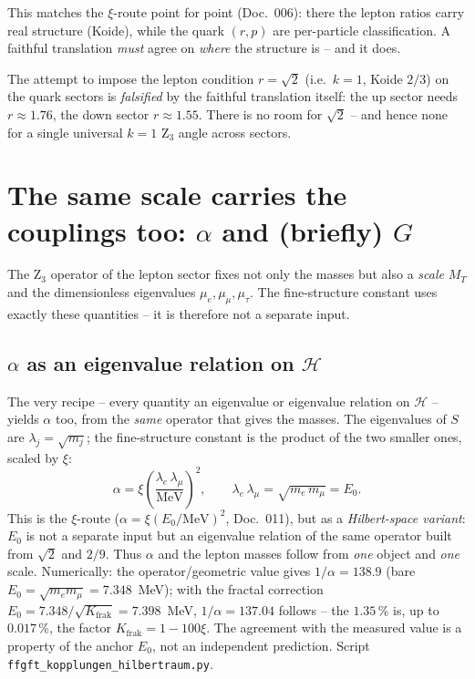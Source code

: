 This matches the $\xi$-route point for point (Doc.~006): there the lepton ratios
carry real structure (Koide), while the quark $(r,p)$ are per-particle
classification. A faithful translation \emph{must} agree on \emph{where} the
structure is -- and it does.

\begin{keyresult}
The attempt to impose the lepton condition $r=\sqrt2$ (i.e.\ $k=1$, Koide $2/3$)
on the quark sectors is \emph{falsified} by the faithful translation itself:
the up sector needs $r\approx1.76$, the down sector $r\approx1.55$. There is no
room for $\sqrt2$ -- and hence none for a single universal $k=1$ Z$_3$ angle
across sectors.
\end{keyresult}

\section{The same scale carries the couplings too: $\alpha$ and (briefly) $G$}

The Z$_3$ operator of the lepton sector fixes not only the masses but also a
\emph{scale} $M_T$ and the dimensionless eigenvalues $\mu_e,\mu_\mu,\mu_\tau$.
The fine-structure constant uses exactly these quantities -- it is therefore not
a separate input.

\subsection{$\alpha$ as an eigenvalue relation on $\mathcal H$}

The very recipe -- every quantity an eigenvalue or eigenvalue relation on
$\mathcal H$ -- yields $\alpha$ too, from the \emph{same} operator that gives the
masses. The eigenvalues of $S$ are $\lambda_j=\sqrt{m_j}$; the fine-structure
constant is the product of the two smaller ones, scaled by $\xi$:
\begin{equation}
  \alpha=\xi\left(\frac{\lambda_e\,\lambda_\mu}{\mathrm{MeV}}\right)^2,
  \qquad \lambda_e\,\lambda_\mu=\sqrt{m_e\,m_\mu}=E_0 .
\end{equation}
This is the $\xi$-route ($\alpha=\xi(E_0/\mathrm{MeV})^2$, Doc.~011), but as a
\emph{Hilbert-space variant}: $E_0$ is not a separate input but an eigenvalue
relation of the same operator built from $\sqrt2$ and $2/9$. Thus $\alpha$ and
the lepton masses follow from \emph{one} object and \emph{one} scale.
Numerically: the operator/geometric value gives $1/\alpha=138.9$ (bare
$E_0 = \sqrt{m_e m_\mu} = 7.348$~MeV); with the fractal correction
$E_0 = 7.348/\sqrt{K_{\text{frak}}} = 7.398$~MeV, $1/\alpha=137.04$ follows --
the $1.35\,\%$ is, up to $0.017\,\%$, the factor $K_{\text{frak}} = 1-100\xi$. The agreement with the measured value is a property of the anchor $E_0$, not an independent prediction. Script
\texttt{ffgft\_kopplungen\_hilbertraum.py}.

